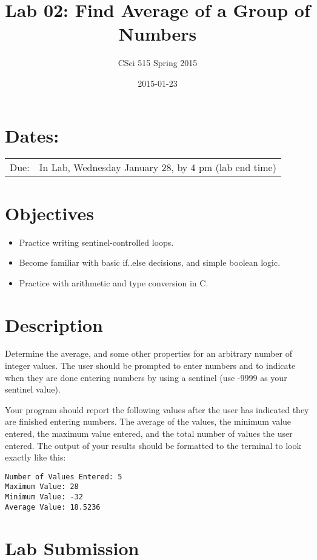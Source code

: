 \documentclass[11pt]{article}
\title{Lab 02: Find Average of a Group of Numbers}
\author{CSci 515 Spring 2015}
\date{2015-01-23}
\begin{document}
\maketitle


\section*{Dates:}
\label{sec-1}


\begin{center}
\begin{tabular}{ll}
 Due:  &  In Lab, Wednesday January 28, by 4 pm (lab end time)  \\
\end{tabular}
\end{center}
\section*{Objectives}
\label{sec-2}

\begin{itemize}
\item Practice writing sentinel-controlled loops.
\item Become familiar with basic if..else decisions, and simple boolean logic.
\item Practice with arithmetic and type conversion in C.
\end{itemize}
\section*{Description}
\label{sec-3}

Determine the average, and some other properties for an arbitrary
number of integer values.  The user should be prompted to enter
numbers and to indicate when they are done entering numbers by using a
sentinel (use -9999 as your sentinel value).

Your program should report the following values after the user has
indicated they are finished entering numbers.  The average of the
values, the minimum value entered, the maximum value entered, and the
total number of values the user entered.  The output of your results
should be formatted to the terminal to look exactly like this:


\begin{verbatim}
Number of Values Entered: 5
Maximum Value: 28
Minimum Value: -32
Average Value: 18.5236
\end{verbatim}
\section*{Lab Submission}
\label{sec-4}
\end{document}
